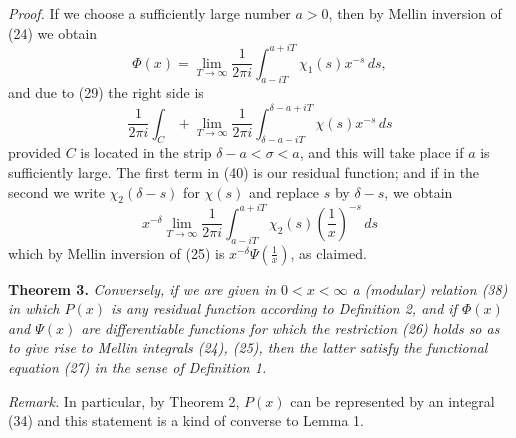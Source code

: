 \documentclass[12pt]{article}
\begin{document}
\medskip

\noindent\emph{Proof.} If we choose a sufficiently large number \(a > 0\), then by Mellin inversion of (24) we obtain
\begin{equation}
\Phi(x) = \lim_{T \to \infty} \frac{1}{2\pi i} \int_{a-iT}^{a+iT} \chi_1(s) x^{-s} \, ds,
\tag{39}
\end{equation}
and due to (29) the right side is
\begin{equation}
\frac{1}{2\pi i} \int_C + \lim_{T \to \infty} \frac{1}{2\pi i} \int_{\delta-a-iT}^{\delta-a+iT} \chi(s) x^{-s} \, ds
\tag{40}
\end{equation}
provided \(C\) is located in the strip \(\delta - a < \sigma < a\), and this will take place if \(a\) is sufficiently large. The first term in (40) is our residual function; and if in the second we write \(\chi_2(\delta - s)\) for \(\chi(s)\) and replace \(s\) by \(\delta - s\), we obtain
\[
x^{-\delta} \lim_{T \to \infty} \frac{1}{2\pi i} \int_{a-iT}^{a+iT} \chi_2(s) \left( \frac{1}{x} \right)^{-s} \, ds
\]
which by Mellin inversion of (25) is \(x^{-\delta} \Psi \left( \frac{1}{x} \right)\), as claimed.

\medskip

\noindent\textbf{Theorem 3.} \emph{Conversely, if we are given in \(0 < x < \infty\) a (modular) relation (38) in which \(P(x)\) is any residual function according to Definition 2, and if \(\Phi(x)\) and \(\Psi(x)\) are differentiable functions for which the restriction (26) holds so as to give rise to Mellin integrals (24), (25), then the latter satisfy the functional equation (27) in the sense of Definition 1.}

\medskip

\noindent\emph{Remark.} In particular, by Theorem 2, \(P(x)\) can be represented by an integral (34) and this statement is a kind of converse to Lemma 1.

\medskip
\end{document}
